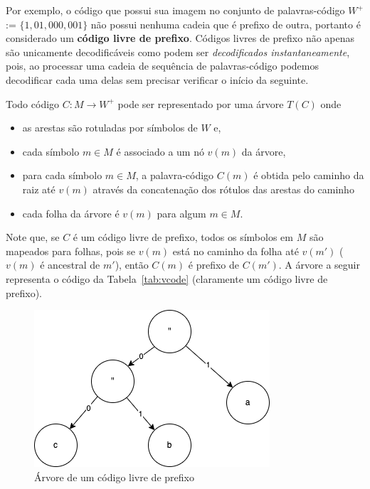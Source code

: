 Por exemplo, o código que possui sua imagem no conjunto de
palavras-código \emph{$W^+$} := $\{1, 01, 000, 001\}$ não possui
nenhuma cadeia que é prefixo de outra, portanto é considerado um
\textbf{código livre de prefixo}.  Códigos livres de prefixo não
apenas são unicamente decodificáveis como podem ser
\emph{decodificados instantaneamente}, pois, ao processar uma cadeia
de sequência de palavras-código podemos decodificar cada uma delas sem
precisar verificar o início da seguinte.

Todo código $C\colon M\to W^+$ pode ser representado por uma árvore
$T(C)$ onde
\begin{itemize}
\item as arestas são rotuladas por símbolos de $W$ e,
\item cada símbolo $m \in M$ é associado a um nó $v(m)$ da árvore,
\item para cada símbolo $m\in M$, a palavra-código $C(m)$ é obtida
  pelo caminho da raiz até $v(m)$ através da concatenação dos rótulos
  das arestas do caminho
\item cada folha da árvore é $v(m)$ para algum $m\in M$.
\end{itemize}
Note que, se $C$ é um código livre de prefixo, todos os símbolos em
$M$ são mapeados para folhas, pois se $v(m)$ está no caminho da folha
até $v(m')$ ($v(m)$ é ancestral de $m'$), então $C(m)$ é prefixo de
$C(m')$. A árvore a seguir representa o código da
Tabela~\ref{tab:vcode} (claramente um código livre de prefixo).

\begin{figure}[h]
   \centering
   \includegraphics[scale=0.75]{figs/prefixtree.png}
    \caption{Árvore de um código livre de prefixo}
    \label{fig:prefixt}
 \end{figure}
